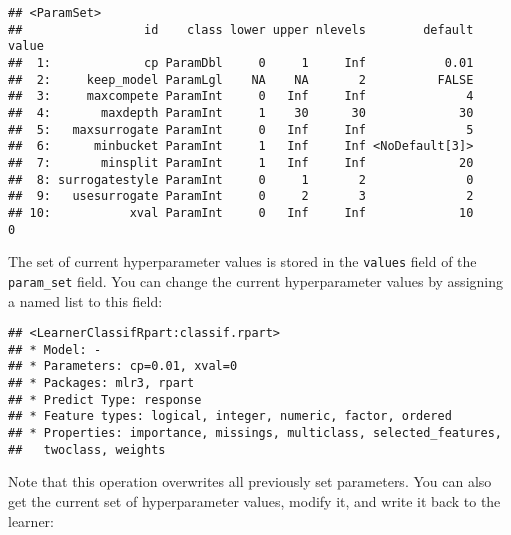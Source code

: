 \documentclass[
]{scrbook}
\newenvironment{Shaded}{\begin{snugshade}}{\end{snugshade}}
\newcommand{\AttributeTok}[1]{\textcolor[rgb]{0.77,0.63,0.00}{#1}}
\newcommand{\DecValTok}[1]{\textcolor[rgb]{0.00,0.00,0.81}{#1}}
\newcommand{\FloatTok}[1]{\textcolor[rgb]{0.00,0.00,0.81}{#1}}
\newcommand{\FunctionTok}[1]{\textcolor[rgb]{0.00,0.00,0.00}{#1}}
\newcommand{\NormalTok}[1]{#1}
\newcommand{\OtherTok}[1]{\textcolor[rgb]{0.56,0.35,0.01}{#1}}
\newcommand{\SpecialCharTok}[1]{\textcolor[rgb]{0.00,0.00,0.00}{#1}}
\renewenvironment{Shaded} {\begin{snugshade}\small} {\end{snugshade}}
\begin{document}
\begin{Shaded}
\end{Shaded}

\begin{verbatim}
## <ParamSet>
##                 id    class lower upper nlevels        default value
##  1:             cp ParamDbl     0     1     Inf           0.01      
##  2:     keep_model ParamLgl    NA    NA       2          FALSE      
##  3:     maxcompete ParamInt     0   Inf     Inf              4      
##  4:       maxdepth ParamInt     1    30      30             30      
##  5:   maxsurrogate ParamInt     0   Inf     Inf              5      
##  6:      minbucket ParamInt     1   Inf     Inf <NoDefault[3]>      
##  7:       minsplit ParamInt     1   Inf     Inf             20      
##  8: surrogatestyle ParamInt     0     1       2              0      
##  9:   usesurrogate ParamInt     0     2       3              2      
## 10:           xval ParamInt     0   Inf     Inf             10     0
\end{verbatim}

The set of current hyperparameter values is stored in the \texttt{values} field of the \texttt{param\_set} field.
You can change the current hyperparameter values by assigning a named list to this field:

\begin{Shaded}
\end{Shaded}

\begin{verbatim}
## <LearnerClassifRpart:classif.rpart>
## * Model: -
## * Parameters: cp=0.01, xval=0
## * Packages: mlr3, rpart
## * Predict Type: response
## * Feature types: logical, integer, numeric, factor, ordered
## * Properties: importance, missings, multiclass, selected_features,
##   twoclass, weights
\end{verbatim}

Note that this operation overwrites all previously set parameters.
You can also get the current set of hyperparameter values, modify it, and write it back to the learner:
\end{document}
